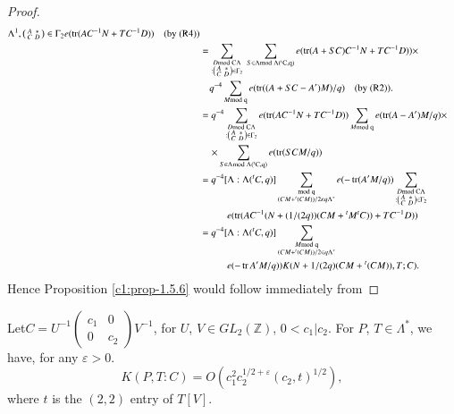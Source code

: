 \begin{proof}
{\begin{align*}
{{    \Lambda^{1},\left(\begin{smallmatrix} A & \ast\\ C & D
    \end{smallmatrix}\right)\in\Gamma_{2}}}e(\operatorname{tr}(AC^{-1}N+TC^{-1}D))\quad\text{(by
  (R4))}\\
&= \sum_{\substack{D\rm{mod} \; C\Lambda\\ :\left(\begin{smallmatrix} A
      &\ast\\ C & D
    \end{smallmatrix}\right)\in\Gamma_{2}}} \; \sum_{S\in\Lambda\rm{mod}\;
  \Lambda({}^{t}C,q)}e(\operatorname{tr}(A+SC)C^{-1}N+TC^{-1}D))\times\\
&\quad q^{-4}\sum_{M\rm{mod} \; q}e(\operatorname{tr}((A+SC-A')M)/q)\quad\text{(by
  (R2)).}\\
&= q^{-4}\sum_{\substack{D\rm{mod} \; C\Lambda\\ :\left(\begin{smallmatrix} A
&\ast\\ C & D
    \end{smallmatrix}\right)\in\Gamma_{2}}}e(\operatorname{tr}(AC^{-1}N+TC^{-1}D))\sum_{M\rm{mod} \;
  q}e(\operatorname{tr}(A-A')M/q)\times\\
&\quad \times \sum_{S\in\Lambda\rm{mod} \; \Lambda({}^{t}C,q)}e(\operatorname{tr}(SCM/q))\\
&= q^{-4}[\Lambda:\Lambda({}^{t}C,q)]
\sum\limits_{\substack{\rm{mod}\; q\\(CM +{}^t (CM))/ 2 \varepsilon q\Lambda^*}}
e(-\operatorname{tr} (A' M/q))
\sum_{\substack{D\rm{mod} \;
    C\Lambda\\ :\left(\begin{smallmatrix} A & \ast\\ C & D
    \end{smallmatrix}
\right)\in \Gamma_{2}}}\\
& \hspace{1cm} e(\operatorname{tr}(AC^{-1}(N+(1/(2q))(CM+{}^{t}M{}^{t}C))+TC^{-1}D))\\
&= q^{-4}[\Lambda:\Lambda({}^{t}C,q)]\sum_{\substack{M\rm{mod} \;
    q\\ (CM+{}^{t}(CM))/2\in q\Lambda^{\ast}}}\\
& \hspace{1cm} e(-\operatorname{tr}
A'M/q))K(N+1/(2q)(CM+{}^{t}(CM)), T;C).
\end{align*}}
Hence Proposition \ref{c1:prop-1.5.6} would follow immediately from 
\end{proof}

\setcounter{subprop}{13}
\begin{subprop}\label{c1:prop-1.5.14}
Let\pageoriginale $C=U^{-1}\left(\begin{smallmatrix} c_{1} & 0\\ 0 & c_{2}
\end{smallmatrix}\right)V^{-1}$, for $U$, $V\in GL_{2}(\mathbb{Z})$,
$0<c_{1}|c_{2}$. For $P$, $T\in\Lambda^{\ast}$, we have, for any
$\varepsilon>0$.
$$
K(P,T:C)=O(c^{2}_{1}c^{1/2+\varepsilon}_{2}(c_{2},t)^{1/2}),
$$
where $t$ is the $(2,2)$ entry of $T[V]$.
\end{subprop}

